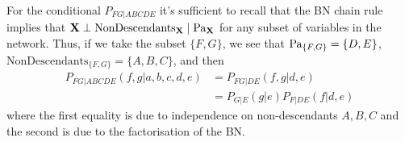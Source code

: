 For the conditional $P_{FG|ABCDE}$ it's sufficient to recall that the BN chain rule implies that $\mathbf X \perp \text{NonDescendants}_{\mathbf X} \mid \mathbf{\text{Pa}}_{\mathbf X}$ for any subset of variables in the network. Thus, if we take the subset $\{F, G\}$, we see that $\mathbf{\text{Pa}}_{\{F, G\}} = \{D, E\}$, $\text{NonDescendants}_{\{F, G\}} = \{A, B, C\}$, and then
\begin{subequations}
\begin{align}
P_{FG|ABCDE}(f, g|a,b,c,d,e) &= P_{FG|DE}(f, g|d,e) \\
 &= P_{G|E}(g|e) P_{F|DE}(f|d,e)
\end{align}
\end{subequations}
where the first equality is due to independence on non-descendants $A,B,C$ and the second is due to the factorisation of the BN.
